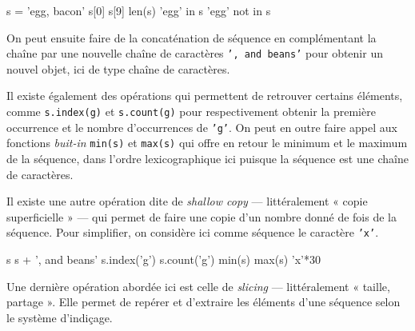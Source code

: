 \begin{idleconsole}
	\begin{pyconsole}
s = 'egg, bacon'
s[0]
s[9]
len(s)
'egg' in s
'egg' not in s
	\end{pyconsole}
\end{idleconsole}

On peut ensuite faire de la concaténation de séquence en complémentant la chaîne par une nouvelle chaîne de caractères \texttt{', and beans'} pour obtenir un nouvel objet, ici de type chaîne de caractères. 

Il existe également des opérations qui permettent de retrouver certains éléments, comme \texttt{s.index(g)} et \texttt{s.count(g)} pour respectivement obtenir la première occurrence et le nombre d’occurrences de \texttt{'g'}. On peut en outre faire appel aux fonctions \textit{buit-in} \texttt{min(s)} et \texttt{max(s)} qui offre en retour le minimum et le maximum de la séquence, dans l'ordre lexicographique ici puisque la séquence est une chaîne de caractères.

Il existe une autre opération dite de \textit{shallow copy} --- littéralement « copie superficielle » --- qui permet de faire une copie d'un nombre donné de fois de la séquence. Pour simplifier, on considère ici comme séquence le caractère \texttt{'x'}. 

\begin{idleconsole}
	\begin{pyconsole}
s 
s + ', and beans'
s.index('g')
s.count('g')
min(s)
max(s)
'x'*30
	\end{pyconsole}
\end{idleconsole}

Une dernière opération abordée ici est celle de \textit{slicing} --- littéralement « taille, partage ». Elle permet de repérer et d'extraire les éléments d'une séquence selon le système d'indiçage. 

